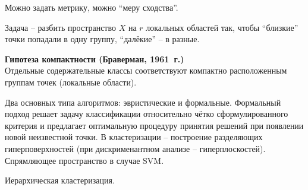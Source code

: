 \documentclass[a4paper]{article}
\newcommand{\eng}[1]{\foreignlanguage{english}{#1}}
\begin{document}
Можно задать метрику, можно ``меру сходства''.

Задача -- разбить пространство $X$ на $r$ локальных областей так, чтобы ``близкие'' точки попадали в одну группу, ``далёкие'' -- в разные.

\textbf{Гипотеза компактности (Браверман, 1961~г.)}\hfill\\
Отдельные содержательные классы соответствуют компактно расположенным группам точек (локальные области).

Два основных типа алгоритмов: эвристические и формальные.
Формальный подход решает задачу классификации относительно чётко сформулированного критерия и предлагает оптимальную процедуру принятия решений при появлении новой неизвестной точки.
В кластеризации -- построение разделяющих гиперповерхностей (при дискрименантном анализе -- гиперплоскостей). Спрямляющее пространство в случае \eng{SVM}.

Иерархическая кластеризация.
\end{document}
